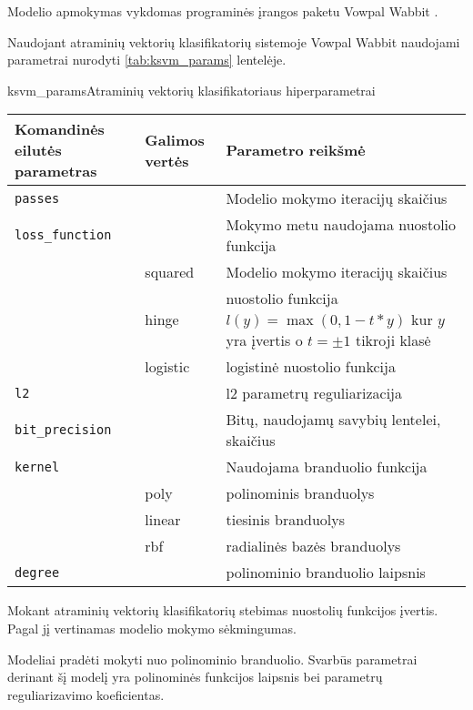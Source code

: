 
Modelio apmokymas vykdomas programinės įrangos paketu Vowpal Wabbit \cite{vw}.


Naudojant atraminių vektorių klasifikatorių sistemoje Vowpal Wabbit naudojami parametrai nurodyti \vref{tab:ksvm_params} lentelėje.

\begin{ktutable}{ksvm_params}{Atraminių vektorių klasifikatoriaus hiperparametrai}
    \begin{tabular}{| l | l | p{7cm}|}
    \hline
        Komandinės eilutės parametras & Galimos vertės & Parametro reikšmė\\ \hline
        \texttt{passes} &  & Modelio mokymo iteracijų skaičius \\ \hline
        \texttt{loss\_function} &          & Mokymo metu naudojama nuostolio funkcija \\
                               & squared  & Modelio mokymo iteracijų skaičius \\
                               & hinge    & nuostolio funkcija $l(y) = \max(0, 1 - t * y)$ kur $y$ yra įvertis o $t = \pm 1$ tikroji klasė  \\
                               & logistic & logistinė nuostolio funkcija \\ \hline
        \texttt{l2} & & l2 parametrų reguliarizacija \\ \hline
        \texttt{bit\_precision} & & Bitų, naudojamų savybių lentelei, skaičius\\ \hline
        \texttt{kernel} & & Naudojama branduolio funkcija   \\
                       & poly & polinominis branduolys     \\
                       & linear & tiesinis branduolys      \\
                       & rbf & radialinės bazės branduolys \\ \hline
        \texttt{degree} & & polinominio branduolio laipsnis \\ \hline
    \end{tabular}
\end{ktutable}

Mokant atraminių vektorių klasifikatorių stebimas nuostolių funkcijos įvertis. Pagal jį
vertinamas modelio mokymo sėkmingumas.

Modeliai pradėti mokyti nuo polinominio branduolio. Svarbūs parametrai derinant šį modelį yra polinominės
funkcijos laipsnis bei parametrų reguliarizavimo koeficientas.

